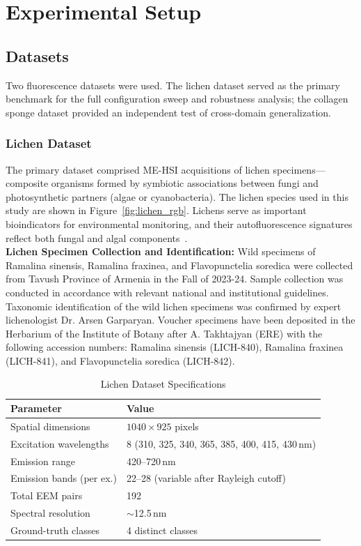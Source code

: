 \section{Experimental Setup}
\label{sec:experimental_setup}
\subsection{Datasets}
\label{sec:datasets}

Two fluorescence datasets were used. The lichen dataset served as the primary benchmark for the full configuration sweep and robustness analysis; the collagen sponge dataset provided an independent test of cross-domain generalization.

\subsubsection{Lichen Dataset}
\label{sec:dataset_lichen}

The primary dataset comprised ME-HSI acquisitions of lichen specimens---composite organisms formed by symbiotic associations between fungi and photosynthetic partners (algae or cyanobacteria).
The lichen species used in this study are shown in Figure~\ref{fig:lichen_rgb}.
Lichens serve as important bioindicators for environmental monitoring, and their autofluorescence signatures reflect both fungal and algal components~\cite{meysurova2021optical}.\\
\textbf{Lichen Specimen Collection and Identification:} Wild specimens of Ramalina sinensis, Ramalina fraxinea, and Flavopunctelia soredica were collected from Tavush Province of Armenia in the Fall of 2023-24. Sample collection was conducted in accordance with relevant national and institutional guidelines. Taxonomic identification of the wild lichen specimens was confirmed by expert lichenologist Dr. Arsen Garparyan. Voucher specimens have been deposited in the Herbarium of the Institute of Botany after A. Takhtajyan (ERE) with the following accession numbers: Ramalina sinensis (LICH-840), Ramalina fraxinea (LICH-841), and Flavopunctelia soredica (LICH-842).

\begin{table}[!t]
\centering
\caption{Lichen Dataset Specifications}
\label{tab:dataset}
\begin{tabular}{@{}ll@{}}
\toprule
\textbf{Parameter} & \textbf{Value} \\
\midrule
Spatial dimensions & $1040 \times 925$ pixels \\
Excitation wavelengths & 8 (310, 325, 340, 365, 385, 400, 415, 430\,nm) \\
Emission range & 420--720\,nm \\
Emission bands (per ex.) & 22--28 (variable after Rayleigh cutoff) \\
Total EEM pairs & 192 \\
Spectral resolution & $\sim$12.5\,nm \\
Ground-truth classes & 4 distinct classes \\
\bottomrule
\end{tabular}
\end{table}

